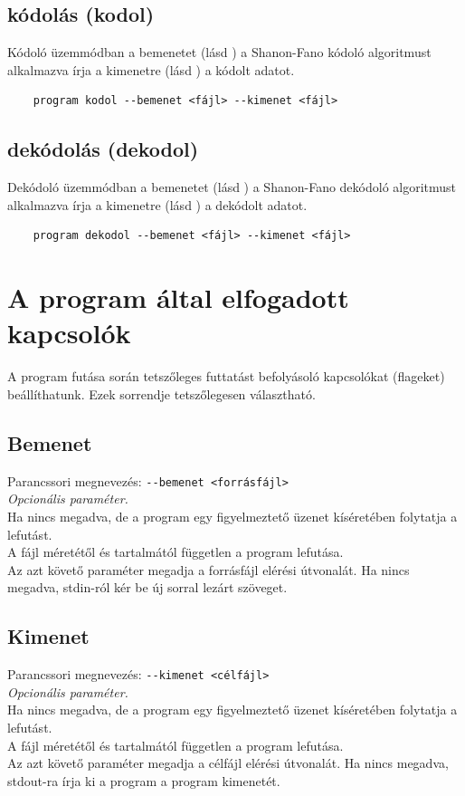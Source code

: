 \documentclass[12pt,a4paper]{report}
\begin{document}
\subsection{kódolás (kodol)}
\label{sec:encode}
Kódoló üzemmódban a bemenetet (lásd ) a Shanon-Fano kódoló algoritmust alkalmazva írja a kimenetre (lásd ) a kódolt adatot.
\begin{verbatim}
    program kodol --bemenet <fájl> --kimenet <fájl>
\end{verbatim}
\subsection{dekódolás (dekodol)}
\label{sec:decode}
Dekódoló üzemmódban a bemenetet (lásd ) a Shanon-Fano dekódoló algoritmust alkalmazva írja a kimenetre (lásd ) a dekódolt adatot.
\begin{verbatim}
    program dekodol --bemenet <fájl> --kimenet <fájl>
\end{verbatim}

\newpage
\section{A program által elfogadott kapcsolók}
\label{sec:flags}
A program futása során tetszőleges futtatást befolyásoló kapcsolókat (flageket) beállíthatunk.
Ezek sorrendje tetszőlegesen választható.
\subsection{Bemenet}
\label{ssec:in}
Parancssori megnevezés: \texttt{-{}-bemenet <forrásfájl>} \\
{\it Opcionális paraméter.}\\
Ha nincs megadva, de a program egy figyelmeztető üzenet kíséretében folytatja a lefutást. \\
A fájl méretétől és tartalmától független a program lefutása. \\
Az azt követő paraméter megadja a forrásfájl elérési útvonalát. Ha nincs megadva, stdin-ról kér be új sorral lezárt szöveget.

\subsection{Kimenet}
\label{ssec:out}
Parancssori megnevezés: \texttt{-{}-kimenet <célfájl>} \\
{\it Opcionális paraméter.}\\
Ha nincs megadva, de a program egy figyelmeztető üzenet kíséretében folytatja a lefutást.\\
A fájl méretétől és tartalmától független a program lefutása. \\
Az azt követő paraméter megadja a célfájl elérési útvonalát. Ha nincs megadva, stdout-ra írja ki a program a program kimenetét.
\end{document}
